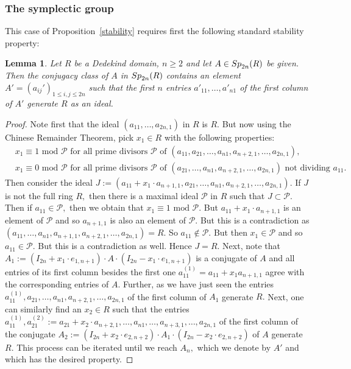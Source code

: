 \documentclass[12pt]{amsart}
\newcommand{\C}[1]{{\mathcal #1}}
\newtheorem{lemma}[theorem]{Lemma}
\theoremstyle{definition}\newtheorem{definition}[theorem]{Definition}
\theoremstyle{remark}\newtheorem{remark}[theorem]{Remark}
\theoremstyle{definition}\newtheorem{case}{Case}
\begin{document}
\subsubsection{The symplectic group}

This case of Proposition~\ref{stability} requires first the following standard stability property:

\begin{lemma}\label{fixing_first_column_symplectic_step1}
Let $R$ be a Dedekind domain, $n\geq 2$ and let $A\in{\rm Sp}_{2n}(R)$ be given. Then the conjugacy class of $A$ in ${\rm Sp}_{2n}(R)$ contains an element $A'=(a_{ij}')_{1\leq i,j\leq 2n}$ such that the first $n$ entries $a'_{11},\dots,a'_{n1}$ of the first column of $A'$ generate $R$ as an ideal.  
\end{lemma}

\begin{proof}
Note first that the ideal $(a_{11},\dots,a_{2n,1})$ in $R$ is $R.$ But now using the Chinese Remainder Theorem, pick $x_1\in R$ with the following properties: 
\begin{align*}
&x_1\equiv 1\text{ mod }\C P\text{ for all prime divisors }\C P\text{ of }(a_{11},a_{21},\dots,a_{n1},a_{n+2,1},\dots,a_{2n,1}),\\
&x_1\equiv 0\text{ mod }\C P\text{ for all prime divisors }\C P\text{ of }(a_{21},\dots,a_{n1},a_{n+2,1},\dots,a_{2n,1})\text{ not dividing }a_{11}.
\end{align*}
Then consider the ideal $J:=(a_{11}+x_1\cdot a_{n+1,1},a_{21},\dots,a_{n1},a_{n+2,1},\dots,a_{2n,1}).$ If $J$ is not the full ring $R,$ then there is a maximal ideal $\C P$ in $R$ such that $J\subset\C P.$ Then if $a_{11}\in\C P,$ then we obtain that $x_1\equiv 1\text{ mod }\C P$. But $a_{11}+x_1\cdot a_{n+1,1}$ is an element of $\C P$ and so $a_{n+1,1}$ is also an element of $\C P.$ But this is a contradiction as $(a_{11},\dots,a_{n1},a_{n+1,1},a_{n+2,1},\dots,a_{2n,1})=R.$ So $a_{11}\notin\C P.$ But then $x_1\in\C P$ and so $a_{11}\in\C P.$ But this is a contradiction as well. Hence $J=R.$ Next, note that $A_1:=(I_{2n}+x_1\cdot e_{1,n+1})\cdot A\cdot (I_{2n}-x_1\cdot e_{1,n+1})$ is a conjugate of $A$ and all entries of its first column besides the first one $a_{11}^{(1)}=a_{11}+x_1a_{n+1,1}$ agree with the corresponding entries of $A.$ Further, as we have just seen the entries $a_{11}^{(1)},a_{21},\dots,a_{n1},a_{n+2,1},\dots,a_{2n,1}$ of the first column of $A_1$ generate $R.$ Next, one can similarly find an $x_2\in R$ such that the entries $a_{11}^{(1)},a_{21}^{(2)}:=a_{21}+x_2\cdot a_{n+2,1},\dots,a_{n1},\dots,a_{n+3,1},\dots,a_{2n,1}$ of the first column of the conjugate $A_2:=(I_{2n}+x_2\cdot e_{2,n+2})\cdot A_1\cdot (I_{2n}-x_2\cdot e_{2,n+2})$ of $A$ generate $R.$ This process can be iterated until we reach $A_n,$ which we denote by $A'$ and which has the desired property.
\end{proof}
\end{document}

